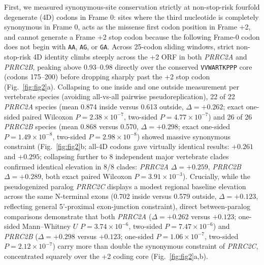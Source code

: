 \documentclass[10pt,letterpaper]{article}
\newcommand{\gene}[1]{\textit{#1}}
\begin{document}
First, we measured synonymous-site conservation strictly at non-stop-risk fourfold degenerate (4D) codons in Frame 0: sites where the third nucleotide is completely synonymous in Frame 0, acts as the missense first codon position in Frame +2, and cannot generate a Frame +2 stop codon because the following Frame-0 codon does not begin with \texttt{AA}, \texttt{AG}, or \texttt{GA}. Across 25-codon sliding windows, strict non-stop-risk 4D identity climbs steeply across the +2 ORF in both \gene{PRRC2A} and \gene{PRRC2B}, peaking above 0.93--0.98 directly over the conserved \texttt{VVWARTKPPP} core (codons 175--200) before dropping sharply past the +2 stop codon (Fig.~\ref{fig:fig2}a). Collapsing to one inside and one outside measurement per vertebrate species (avoiding all-vs-all pairwise pseudoreplication), 22 of 22 \gene{PRRC2A} species (mean 0.874 inside versus 0.613 outside, $\Delta = +0.262$; exact one-sided paired Wilcoxon $P = 2.38 \times 10^{-7}$, two-sided $P = 4.77 \times 10^{-7}$) and 26 of 26 \gene{PRRC2B} species (mean 0.868 versus 0.570, $\Delta = +0.298$; exact one-sided $P = 1.49 \times 10^{-8}$, two-sided $P = 2.98 \times 10^{-8}$) showed massive synonymous constraint (Fig.~\ref{fig:fig2}b; all-4D codons gave virtually identical results: $+0.261$ and $+0.295$; collapsing further to 8 independent major vertebrate clades confirmed identical elevation in 8/8 clades: \gene{PRRC2A} $\Delta = +0.259$, \gene{PRRC2B} $\Delta = +0.289$, both exact paired Wilcoxon $P = 3.91 \times 10^{-3}$). Crucially, while the pseudogenized paralog \gene{PRRC2C} displays a modest regional baseline elevation across the same N-terminal exons (0.702 inside versus 0.579 outside, $\Delta = +0.123$, reflecting general 5'-proximal exon-junction constraint), direct between-paralog comparisons demonstrate that both \gene{PRRC2A} ($\Delta = +0.262$ versus $+0.123$; one-sided Mann--Whitney $U$ $P = 3.74 \times 10^{-6}$, two-sided $P = 7.47 \times 10^{-6}$) and \gene{PRRC2B} ($\Delta = +0.298$ versus $+0.123$; one-sided $P = 1.06 \times 10^{-7}$, two-sided $P = 2.12 \times 10^{-7}$) carry more than double the synonymous constraint of \gene{PRRC2C}, concentrated squarely over the +2 coding core (Fig.~\ref{fig:fig2}a,b).
\end{document}
